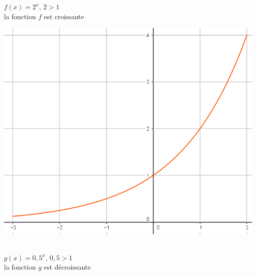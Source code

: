 \documentclass[12pt,a4paper]{article}
\begin{document}
\begin{myex}
	\begin{multicols}{2}
		$f(x)= 2^x$, $2 > 1$\\
		la fonction $f$ est croissante
		
		\begin{center}
			\includegraphics[scale=0.3]{./img/var1}
		\end{center}
		
		\ \\
		$g(x)= 0,5^x$, $0,5 > 1$\\
		la fonction $g$ est décroissante
		

\end{multicols}
\end{myex}
\end{document}
